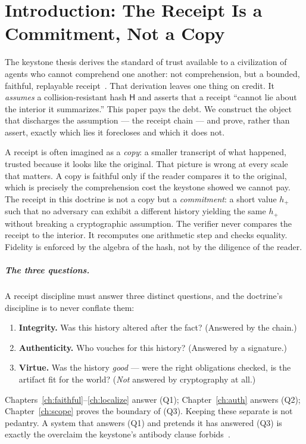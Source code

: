 \documentclass[11pt,oneside]{book}
\theoremstyle{definition}
\theoremstyle{plain}
\theoremstyle{remark}
\newcommand{\chainH}{\mathsf{H}}               %
\begin{document}
\tableofcontents

\mainmatter

\chapter{Introduction: The Receipt Is a Commitment, Not a Copy}
\label{ch:intro}

The keystone thesis derives the standard of trust available to a civilization of agents who cannot comprehend one another: not comprehension, but a bounded, faithful, replayable receipt~\cite{chatman2025}. %
That derivation leaves one thing on credit. %
It \emph{assumes} a collision-resistant hash $\chainH$ and asserts that a receipt ``cannot lie about the interior it summarizes.'' This paper pays the debt. %
We construct the object that discharges the assumption --- the receipt chain --- and prove, rather than assert, exactly which lies it forecloses and which it does not. %

A receipt is often imagined as a \emph{copy}: a smaller transcript of what happened, trusted because it looks like the original. That picture is wrong at every scale that matters. %
A copy is faithful only if the reader compares it to the original, which is precisely the comprehension cost the keystone showed we cannot pay. %
The receipt in this doctrine is not a copy but a \emph{commitment}: a short value $h_{+}$ such that no adversary can exhibit a different history yielding the same $h_{+}$ without breaking a cryptographic assumption. %
The verifier never compares the receipt to the interior. %
It recomputes one arithmetic step and checks equality. %
Fidelity is enforced by the algebra of the hash, not by the diligence of the reader. %

\paragraph{The three questions.} A receipt discipline must answer three distinct questions,
and the doctrine's discipline is to never conflate them: %
\begin{enumerate}[label=(Q\arabic*),leftmargin=*]
\item \textbf{Integrity.} Was this history altered after the fact? (Answered by the chain.)
\item \textbf{Authenticity.} Who vouches for this history? (Answered by a signature.)
\item \textbf{Virtue.} Was the history \emph{good} --- were the right obligations checked, is
the artifact fit for the world? (\emph{Not} answered by cryptography at all.) %
\end{enumerate}
Chapters~\ref{ch:faithful}--\ref{ch:localize} answer (Q1); Chapter~\ref{ch:auth} answers (Q2); Chapter~\ref{ch:scope} proves the boundary of (Q3). %
Keeping these separate is not pedantry. %
A system that answers (Q1) and pretends it has answered (Q3) is exactly the overclaim the keystone's antibody clause forbids~\cite{chatman2025}. %
\end{document}

